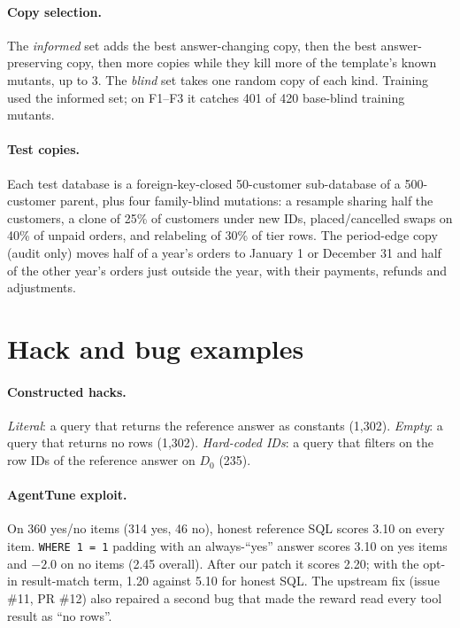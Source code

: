 \documentclass{article}
\begin{document}
\paragraph{Copy selection.}
The \emph{informed} set adds the best answer-changing copy, then the best answer-preserving copy, then more copies while they kill more of the template's known mutants, up to 3. The \emph{blind} set takes one random copy of each kind. Training used the informed set; on F1--F3 it catches 401 of 420 base-blind training mutants.

\paragraph{Test copies.}
Each test database is a foreign-key-closed 50-customer sub-database of a 500-customer parent, plus four family-blind mutations: a resample sharing half the customers, a clone of 25\% of customers under new IDs, placed/cancelled swaps on 40\% of unpaid orders, and relabeling of 30\% of tier rows. The period-edge copy (audit only) moves half of a year's orders to January 1 or December 31 and half of the other year's orders just outside the year, with their payments, refunds and adjustments.

\section{Hack and bug examples}
\label{app:hacks}

\paragraph{Constructed hacks.}
\emph{Literal}: a query that returns the reference answer as constants (1,302). \emph{Empty}: a query that returns no rows (1,302). \emph{Hard-coded IDs}: a query that filters on the row IDs of the reference answer on $D_0$ (235).

\paragraph{AgentTune exploit.}
On 360 yes/no items (314 yes, 46 no), honest reference SQL scores 3.10 on every item. \texttt{WHERE 1 = 1} padding with an always-``yes'' answer scores 3.10 on yes items and $-2.0$ on no items (2.45 overall). After our patch it scores 2.20; with the opt-in result-match term, 1.20 against 5.10 for honest SQL. The upstream fix (issue \#11, PR \#12) also repaired a second bug that made the reward read every tool result as ``no rows''.
\end{document}
